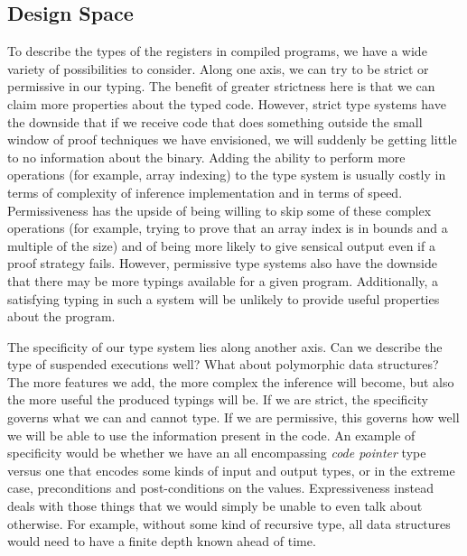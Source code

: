 \subsection{Design Space}
To describe the types of the registers in compiled programs, we have a wide variety of possibilities to consider. Along one axis, we can try to be strict or permissive in our typing. The benefit of greater strictness here is that we can claim more properties about the typed code. However, strict type systems have the downside that if we receive code that does something outside the small window of proof techniques we have envisioned, we will suddenly be getting little to no information about the binary. Adding the ability to perform more operations (for example, array indexing) to the type system is usually costly in terms of complexity of inference implementation and in terms of speed. Permissiveness has the upside of being willing to skip some of these complex operations (for example, trying to prove that an array index is in bounds and a multiple of the size) and of being more likely to give sensical output even if a proof strategy fails. However, permissive type systems also have the downside that there may be more typings available for a given program. Additionally, a satisfying typing in such a system will be unlikely to provide useful properties about the program.

The specificity of our type system lies along another axis. Can we describe the type of suspended executions well? What about polymorphic data structures? The more features we add, the more complex the inference will become, but also the more useful the produced typings will be. If we are strict, the specificity governs what we can and cannot type. If we are permissive, this governs how well we will be able to use the information present in the code. An example of specificity would be whether we have an all encompassing \emph{code pointer} type versus one that encodes some kinds of input and output types, or in the extreme case, preconditions and post-conditions on the values. Expressiveness instead deals with those things that we would simply be unable to even talk about otherwise. For example, without some kind of recursive type, all data structures would need to have a finite depth known ahead of time.

